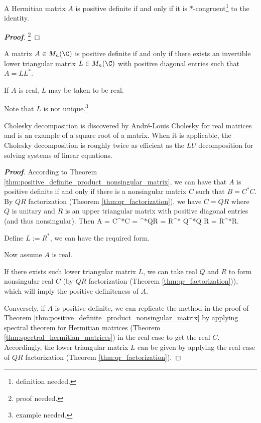 \begin{corollary}
A Hermitian matrix $A$ is positive definite if and only if it is $*$-congruent\footnote{definition needed.} to the identity.
\end{corollary}

\begin{proof}[\bf Proof]
\footnote{proof needed.}
\end{proof}


\begin{corollary}\label{cor:cholesky_decomposition}
A matrix $A\in M_n(\C)$ is positive definite if and only if there exists an invertible lower triangular matrix $L \in M_n(\C)$ with positive diagonal entries such that $A = LL^*$.

If $A$ is real, $L$ may be taken to be real.

Note that $L$ is not unique.\footnote{example needed.} %
\end{corollary}

\begin{remark}
Cholesky decomposition is discovered by Andr\'e-Louis Cholesky for real matrices and is an example of a square root of a matrix. When it is applicable, the Cholesky decomposition is roughly twice as efficient as the $LU$ decomposition for solving systems of linear equations.
\end{remark}

\begin{proof}[\bf Proof]%
According to Theorem \ref{thm:positive_definite_product_nonsingular_matrix}, we can have that $A$ is positive definite if and only if there is a nonsingular matrix $C$ such that $B =C^*C$. By $QR$
factorization (Theorem \ref{thm:qr_factorization}), we have $C = QR$ where $Q$ is unitary and $R$ is an upper triangular matrix with positive diagonal entries (and thus nonsingular). Then
\be
A = C^*C = ^*QR = R^* Q^*Q R = R^*R.
\ee

Define $L := R^*$, we can have the required form.

Now assume $A$ is real.

If there exists such lower triangular matrix $L$, we can take real $Q$ and $R$ to form nonsingular real $C$ (by $QR$ factorization (Theorem \ref{thm:qr_factorization})), which will imply the
positive definiteness of $A$.

Conversely, if $A$ is positive definite, we can replicate the method in the proof of Theorem \ref{thm:positive_definite_product_nonsingular_matrix} by applying spectral theorem for Hermitian
matrices (Theorem \ref{thm:spectral_hermitian_matrices}) in the real case to get the real $C$. Accordingly, the lower triangular matrix $L$ can be given by applying the real case of $QR$
factorization (Theorem \ref{thm:qr_factorization}).
\end{proof}

